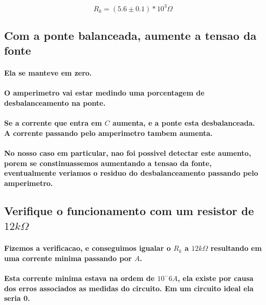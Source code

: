 \documentclass[12pt,twoside, a4paper, twocolumn]{article}
\begin{document}
\begin{equation}
    R_k = (5.6 \pm 0.1) * 10^3 \varOmega
\end{equation}

\subsection{Com a ponte balanceada, aumente a tensao da fonte}

\paragraph*{Ela se manteve em zero.}

\paragraph*{O amperimetro vai estar medindo uma porcentagem de desbalanceamento na ponte. }

\paragraph*{Se a corrente que entra em $C$ aumenta, e a ponte esta desbalanceada. A corrente passando pelo amperimetro tambem aumenta.}

\paragraph*{No nosso caso em particular, nao foi possivel detectar este aumento, porem se constinuassemos aumentando a tensao da fonte, eventualmente veriamos o residuo do desbalanceamento passando pelo amperimetro.}

\subsection{Verifique o funcionamento com um resistor de $12k \varOmega$}

\paragraph*{Fizemos a verificacao, e conseguimos igualar o $R_k$ a $12k \varOmega$ resultando em uma corrente minima passando por $A$. }

\paragraph*{Esta corrente minima estava na ordem de $10^-6 A$, ela existe por causa dos erros associados as medidas do circuito. Em um circuito ideal ela seria 0.}
\end{document}
